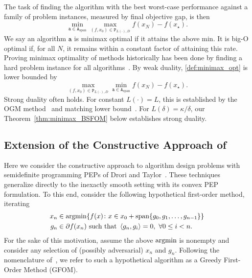 \documentclass[11pt, hidelinks]{article}
\numberwithin{equation}{section}
\newcommand{\argmin}{\operatornamewithlimits{argmin}}
\theoremstyle{thmstyletwo}%
\numberwithin{equation}{section}
\newcommand{\inner}[2]{\left\langle {#1}, {#2} \right\rangle}
\newcommand{\Algclass}[1]{\mathtt{A}_{\mathrm{{#1}}}}
\begin{document}
The task of finding the algorithm with the best worst-case performance against a family of problem instances, measured by final objective gap, is then
\begin{equation}\label{def:minimax_opt}
    \min_{\mathtt{a} \in \Algclass{span}}\max_{(f,x_0) \in \mathtt{P}_{L(\cdot), D}} f(x_N) - f(x_\star).
\end{equation} 
We say an algorithm $\mathtt{a}$ is minimax optimal if it attains the above min. It is big-O optimal if, for all $N$, it remains within a constant factor of attaining this rate. Proving minimax optimality of methods historically has been done by finding a hard problem instance for all algorithms~\cite{nemirovskilowerbounds}. By weak duality, \eqref{def:minimax_opt} is lower bounded by 
\begin{equation}\label{def:maximin_hard}
  \max_{(f,x_0) \in \mathtt{P}_{L(\cdot), D}}  \min_{\mathtt{a} \in \Algclass{span}} f(x_N) - f(x_\star).
\end{equation} 
Strong duality often holds. For constant $L(\cdot)=L$, this is established by the OGM method~\cite{kim2016optimized} and matching lower bound~\cite{drori2017exact}. For $L(\delta)=\kappa/\delta$, our Theorem~\ref{thm:minimax_BSFOM} below establishes strong duality.


\subsection{Extension of the Constructive Approach of~\cite{constructive_approach}}\label{subsec:Constructive Approach}

Here we consider the constructive approach to algorithm design problems with semidefinite programming PEPs of Drori and Taylor~\cite{constructive_approach}. These techniques generalize directly to the inexactly smooth setting with its convex PEP formulation.
To this end, consider the following hypothetical first-order method, iterating
\begin{align*}
    x_n &\in \argmin \{f(x) \colon x \in x_0 + \mathrm{span}\{g_0, g_1, \dots, g_{n-1}\}\}\\
   g_n &\in \partial f(x_n) \ \text{such that } \inner{g_n}{g_i} = 0, \ \forall 0 \leq i < n.
\end{align*}
For the sake of this motivation, assume the above $\argmin$ is nonempty and consider any selection of (possibly adversarial) $x_n$ and $g_n$. Following the nomenclature of~\cite{constructive_approach}, we refer to such a hypothetical algorithm as a Greedy First-Order Method (GFOM).
\end{document}

